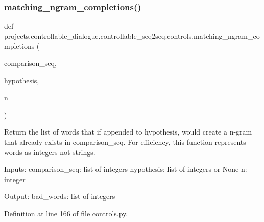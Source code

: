 \mbox{\label{namespaceprojects_1_1controllable__dialogue_1_1controllable__seq2seq_1_1controls_ab562827e4a16578079aa8121ebadcda7}} 
\subsubsection{\texorpdfstring{matching\+\_\+ngram\+\_\+completions()}{matching\_ngram\_completions()}}
{\footnotesize\ttfamily def projects.\+controllable\+\_\+dialogue.\+controllable\+\_\+seq2seq.\+controls.\+matching\+\_\+ngram\+\_\+completions (\begin{DoxyParamCaption}\item[{}]{comparison\+\_\+seq,  }\item[{}]{hypothesis,  }\item[{}]{n }\end{DoxyParamCaption})}

\begin{DoxyVerb}Return the list of words that if appended to hypothesis, would create a n-gram that
already exists in comparison_seq. For efficiency, this function represents words as
integers not strings.

Inputs:
    comparison_seq: list of integers
    hypothesis: list of integers or None
    n: integer

Output:
    bad_words: list of integers
\end{DoxyVerb}
 

Definition at line 166 of file controls.\+py.


